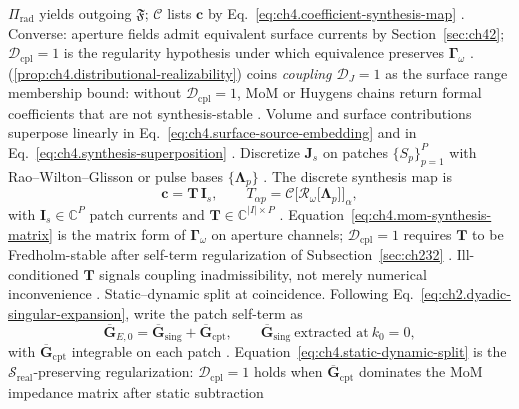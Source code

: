 \(\Pi_{\mathrm{rad}}\) yields outgoing \(\mathfrak{F}\); \(\mathcal{C}\) lists \(\mathbf{c}\) by
Eq.~\eqref{eq:ch4.coefficient-synthesis-map} \cite{stratton1941}. Converse: aperture fields
admit equivalent surface currents by Section~\ref{sec:ch42}; \(\mathcal{D}_{\mathrm{cpl}}=1\) is the
regularity hypothesis under which equivalence preserves \(\boldsymbol{\Gamma}_\omega\)
\cite{collin2001}.
(\ref{prop:ch4.distributional-realizability}) coins \emph{coupling $\mathcal{D}_J=1$} as the surface
range membership bound: without \(\mathcal{D}_{\mathrm{cpl}}=1\), MoM or Huygens chains return
formal coefficients that are not synthesis-stable \cite{harrington2001}. Volume and surface contributions
superpose linearly in Eq.~\eqref{eq:ch4.surface-source-embedding} and in
Eq.~\eqref{eq:ch4.synthesis-superposition} \cite{stratton1941}.
Discretize \(\mathbf{J}_{s}\) on patches \(\{S_{p}\}_{p=1}^{P}\) with Rao--Wilton--Glisson or pulse bases
\(\{\boldsymbol{\Lambda}_{p}\}\) \cite{harrington2001}. The discrete synthesis map is
\begin{equation}
\label{eq:ch4.mom-synthesis-matrix}
\mathbf{c}
=
\mathbf{T}\,\mathbf{I}_{s},
\qquad
T_{\alpha p}
=
\mathcal{C}\Big[\mathcal{R}_\omega\big[\boldsymbol{\Lambda}_{p}\big]\Big]_{\alpha},
\end{equation}
with \(\mathbf{I}_{s}\in\mathbb{C}^{P}\) patch currents and \(\mathbf{T}\in\mathbb{C}^{|I|\times P}\)
\cite{harrington2001}. Equation~\eqref{eq:ch4.mom-synthesis-matrix} is the matrix form of
\(\boldsymbol{\Gamma}_\omega\) on aperture channels; \(\mathcal{D}_{\mathrm{cpl}}=1\) requires
\(\mathbf{T}\) to be Fredholm-stable after self-term regularization of Subsection~\ref{sec:ch232}
\cite{stratton1941}. Ill-conditioned \(\mathbf{T}\) signals coupling inadmissibility, not merely
numerical inconvenience \cite{harrington2001}.
Static--dynamic split at coincidence. Following Eq.~\eqref{eq:ch2.dyadic-singular-expansion}, write the patch self-term as
\begin{equation}
\label{eq:ch4.static-dynamic-split}
\overline{\mathbf{G}}_{E,0}
=
\overline{\mathbf{G}}_{\mathrm{sing}}+\overline{\mathbf{G}}_{\mathrm{cpt}},
\qquad
\overline{\mathbf{G}}_{\mathrm{sing}}\ \text{extracted at}\ k_{0}=0,
\end{equation}
with \(\overline{\mathbf{G}}_{\mathrm{cpt}}\) integrable on each patch \cite{harrington2001}.
Equation~\eqref{eq:ch4.static-dynamic-split} is the $\mathcal{S}_{\mathrm{real}}$-preserving regularization: \(\mathcal{D}_{\mathrm{cpl}}=1\)
holds when \(\overline{\mathbf{G}}_{\mathrm{cpt}}\) dominates the MoM impedance matrix after static subtraction
